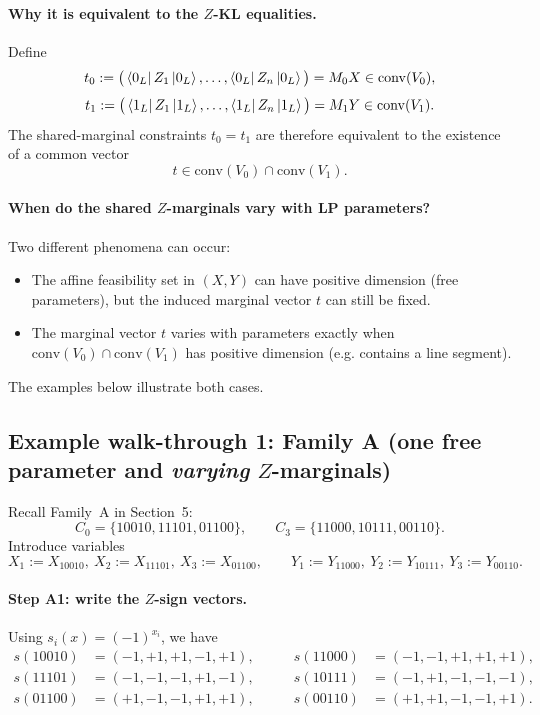 \documentclass[11pt]{article}
\begin{document}
\paragraph{Why it is equivalent to the $Z$-KL equalities.}
Define
\[
 t_0:=\big(\bra{0_L}Z_1\ket{0_L},\dots,\bra{0_L}Z_n\ket{0_L}\big)=M_0X\in\mathrm{conv}(V_0),
\]
\[
 t_1:=\big(\bra{1_L}Z_1\ket{1_L},\dots,\bra{1_L}Z_n\ket{1_L}\big)=M_1Y\in\mathrm{conv}(V_1).
\]
The shared-marginal constraints $t_0=t_1$ are therefore equivalent to the existence of a common vector
\[
 t\in \mathrm{conv}(V_0)\cap \mathrm{conv}(V_1).
\]

\paragraph{When do the shared $Z$-marginals vary with LP parameters?}
Two different phenomena can occur:
\begin{itemize}
\item The affine feasibility set in $(X,Y)$ can have positive dimension (free parameters), but the induced marginal vector $t$ can still be fixed.
\item The marginal vector $t$ varies with parameters exactly when $\mathrm{conv}(V_0)\cap\mathrm{conv}(V_1)$ has positive dimension (e.g. contains a line segment).
\end{itemize}
The examples below illustrate both cases.

\subsection{Example walk-through 1: Family A (one free parameter and \emph{varying} $Z$-marginals)}
\label{subsec:walkthrough-familyA}

Recall Family~A in Section~5:
\[
C_0=\{10010,11101,01100\},\qquad C_3=\{11000,10111,00110\}.
\]
Introduce variables
\[
X_1:=X_{10010},\ X_2:=X_{11101},\ X_3:=X_{01100},\qquad
Y_1:=Y_{11000},\ Y_2:=Y_{10111},\ Y_3:=Y_{00110}.
\]

\paragraph{Step A1: write the $Z$-sign vectors.}
Using $s_i(x)=(-1)^{x_i}$, we have
\[
\begin{aligned}
 s(10010)&=(-1,+1,+1,-1,+1),\\
 s(11101)&=(-1,-1,-1,+1,-1),\\
 s(01100)&=(+1,-1,-1,+1,+1),
\end{aligned}
\qquad
\begin{aligned}
 s(11000)&=(-1,-1,+1,+1,+1),\\
 s(10111)&=(-1,+1,-1,-1,-1),\\
 s(00110)&=(+1,+1,-1,-1,+1).
\end{aligned}
\]
\end{document}
